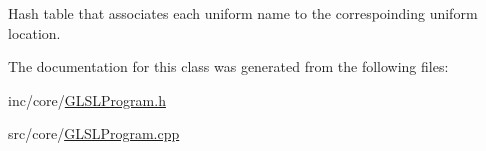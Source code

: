 Hash table that associates each uniform name to the correspoinding uniform location. 



The documentation for this class was generated from the following files\+:\begin{DoxyCompactItemize}
\item 
inc/core/\hyperlink{_g_l_s_l_program_8h}{G\+L\+S\+L\+Program.\+h}\item 
src/core/\hyperlink{_g_l_s_l_program_8cpp}{G\+L\+S\+L\+Program.\+cpp}\end{DoxyCompactItemize}
